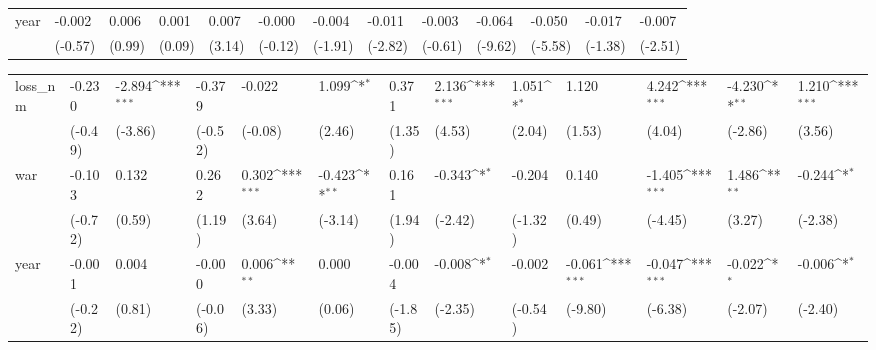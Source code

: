\begin{tabular}{p{1.5cm} p{1.7cm} p{1.7cm} p{1.7cm} p{1.7cm} p{1.7cm} p{1.7cm} p{1.7cm} p{1.7cm} p{1.7cm} p{1.7cm} p{1.7cm} p{1.7cm}}
year            &   -0.002         &    0.006         &    0.001         &    0.007\sym{**} &   -0.000         &   -0.004         &   -0.011\sym{**} &   -0.003         &   -0.064\sym{***}&   -0.050\sym{***}&   -0.017         &   -0.007\sym{*}  \\
                &  (-0.57)         &   (0.99)         &   (0.09)         &   (3.14)         &  (-0.12)         &  (-1.91)         &  (-2.82)         &  (-0.61)         &  (-9.62)         &  (-5.58)         &  (-1.38)         &  (-2.51)         \\
\end{tabular}
\def\sym#1{\ifmmode^{#1}\else\(^{#1}\)\fi}
\begin{tabular}{p{1.5cm} p{1.7cm} p{1.7cm} p{1.7cm} p{1.7cm} p{1.7cm} p{1.7cm} p{1.7cm} p{1.7cm} p{1.7cm} p{1.7cm} p{1.7cm} p{1.7cm}}
\hline
loss\_nm         &   -0.230         &   -2.894\sym{***}&   -0.379         &   -0.022         &    1.099\sym{*}  &    0.371         &    2.136\sym{***}&    1.051\sym{*}  &    1.120         &    4.242\sym{***}&   -4.230\sym{**} &    1.210\sym{***}\\
                &  (-0.49)         &  (-3.86)         &  (-0.52)         &  (-0.08)         &   (2.46)         &   (1.35)         &   (4.53)         &   (2.04)         &   (1.53)         &   (4.04)         &  (-2.86)         &   (3.56)         \\
war             &   -0.103         &    0.132         &    0.262         &    0.302\sym{***}&   -0.423\sym{**} &    0.161         &   -0.343\sym{*}  &   -0.204         &    0.140         &   -1.405\sym{***}&    1.486\sym{**} &   -0.244\sym{*}  \\
                &  (-0.72)         &   (0.59)         &   (1.19)         &   (3.64)         &  (-3.14)         &   (1.94)         &  (-2.42)         &  (-1.32)         &   (0.49)         &  (-4.45)         &   (3.27)         &  (-2.38)         \\
year            &   -0.001         &    0.004         &   -0.000         &    0.006\sym{**} &    0.000         &   -0.004         &   -0.008\sym{*}  &   -0.002         &   -0.061\sym{***}&   -0.047\sym{***}&   -0.022\sym{*}  &   -0.006\sym{*}  \\
                &  (-0.22)         &   (0.81)         &  (-0.06)         &   (3.33)         &   (0.06)         &  (-1.85)         &  (-2.35)         &  (-0.54)         &  (-9.80)         &  (-6.38)         &  (-2.07)         &  (-2.40)         \\
\end{tabular}
